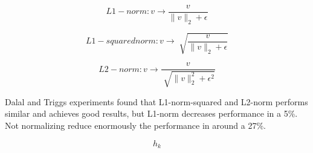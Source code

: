\begin{equation}\label{eq:L1-norm}
L1-norm: v\rightarrow \frac{v}{	\|v\|_2 + \epsilon}
\end{equation}

\begin{equation}\label{eq:L1-squared}
L1-squared norm: v\rightarrow \sqrt[]{\frac{v}{	\|v\|_2 + \epsilon}}
\end{equation}

\begin{equation}\label{eq:L2-norm}
L2-norm: v\rightarrow \frac{v}{\sqrt[]{	\|v\|_2^2 + \epsilon^2}}
\end{equation}

Dalal and Triggs experiments found that L1-norm-squared and L2-norm performs similar and achieves good results, but L1-norm decreases performance in a 5\%. Not normalizing reduce enormously the performance in around a 27\%. 


\begin{equation}\label{eq:NoOfLBPCells}
h_k
\end{equation}





